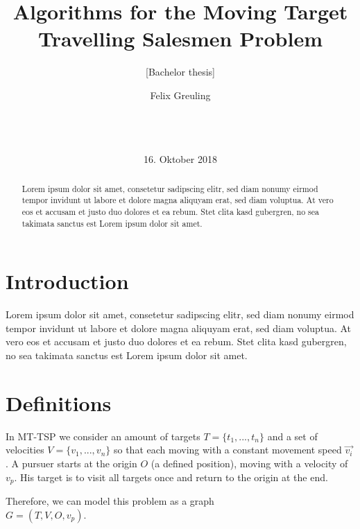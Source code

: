 \documentclass{acm_proc_article-sp}
\begin{document}
\title{Algorithms for the Moving Target Travelling Salesmen Problem}
\subtitle{[Bachelor thesis]}
\author{
\alignauthor
Felix Greuling\\
       \\ 
       \\
       \\ 
}
\date{16. Oktober 2018}
\maketitle

\begin{abstract}
Lorem ipsum dolor sit amet, consetetur sadipscing elitr, sed diam nonumy eirmod tempor invidunt ut labore et dolore magna aliquyam erat, sed diam voluptua. At vero eos et accusam et justo duo dolores et ea rebum. Stet clita kasd gubergren, no sea takimata sanctus est Lorem ipsum dolor sit amet.
\end{abstract}

\section{Introduction}
Lorem ipsum dolor sit amet, consetetur sadipscing elitr, sed diam nonumy eirmod tempor invidunt ut labore et dolore magna aliquyam erat, sed diam voluptua. At vero eos et accusam et justo duo dolores et ea rebum. Stet clita kasd gubergren, no sea takimata sanctus est Lorem ipsum dolor sit amet.

\section{Definitions}
In MT-TSP we consider an amount of targets $T=\{t_1,...,t_n\}$ and a set of velocities $V=\{v_1,...,v_n\}$ so that each moving with a constant movement speed $\overrightarrow{v_i}$. A pursuer starts at the origin $O$ (a defined position), moving with a velocity of $v_p$.  His target is to visit all targets once and return to the origin at the end.

Therefore, we can model this problem as a graph \\
$G=(T, V, O, v_p)$. 
\end{document}
